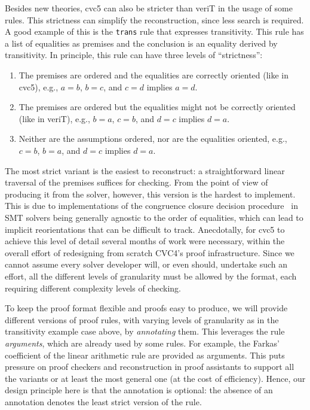 \documentclass[submission,copyright,creativecommons]{eptcs}
\begin{document}
Besides new theories, cvc5 can also be stricter than veriT in the usage
of some rules.
%
This strictness can simplify the reconstruction, since less search is
required.
%
A good example of this is the \texttt{trans} rule that expresses
transitivity.
%
This rule has a list of equalities as premises and the conclusion is
an equality derived by transitivity.
%
In principle, this rule can have three levels of ``strictness'':
\begin{enumerate}
\item The premises are ordered and the equalities are correctly oriented (like in cvc5), e.g.,
  \(a=b\), \(b=c\), and \(c=d\) implies \(a=d\).
\item The premises are ordered but the equalities might not be correctly oriented (like in veriT), e.g.,
  \(b=a\), \(c=b\), and \(d=c\) implies \(d=a\).
\item Neither are the assumptions ordered, nor are the equalities oriented, e.g., \(c=b\),
  \(b=a\), and \(d=c\) implies \(d=a\).
\end{enumerate}

\noindent
The most strict variant is the easiest to reconstruct: a straightforward linear
traversal of the premises suffices for checking.
%
From the point of view of producing it from the solver, however, this version is
the hardest to implement. This is due to implementations of the
congruence closure decision procedure~\cite{Nelson1980,Downey1980} in SMT
solvers being generally agnostic to the order of equalities, which can lead to
implicit reorientations that can be difficult to track.
%
Anecdotally, for cvc5 to achieve this level of detail several months of work
were necessary, within the overall effort of redesigning from scratch CVC4's
proof infrastructure.
%
Since we cannot assume every solver developer will, or even should, undertake
such an effort, all the different levels of granularity must be allowed by the
format, each requiring different complexity levels of checking.

To keep the proof format flexible and proofs easy to produce, we will
provide different versions of proof rules, with varying levels of granularity as
in the transitivity example case above, by \emph{annotating} them.
%
This leverages the rule \emph{arguments},
%
which are already used by some
rules.
%
For example, the Farkas' coefficient of the linear arithmetic rule are provided
as arguments.
%
This puts pressure on proof checkers and reconstruction in proof assistants to
support all the variants or at least the most general one (at the cost of
efficiency).  Hence, our design principle here is that the annotation is
optional: the absence of an annotation denotes the least strict version of the
rule.
\end{document}
